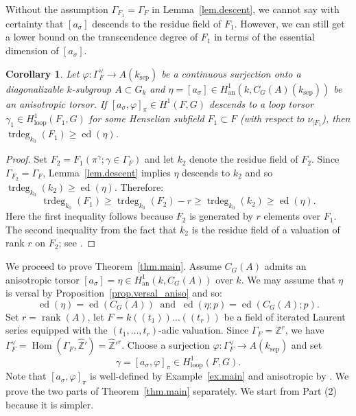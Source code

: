 \documentclass[12pt]{amsart}
\numberwithin{equation}{section}
\newtheorem{corollary}[theorem]{Corollary}
\theoremstyle{definition}
\newcommand{\bZ}{\mathbb{Z}}
\newcommand{\an}{\operatorname{an}}
\newcommand{\Hom}{\operatorname{Hom}}
\newcommand{\trdeg}{\operatorname{trdeg}}
\newcommand{\ed}{\operatorname{ed}}
\newcommand{\rank}{\operatorname{rank}}
\newcommand{\sep}{\operatorname{sep}}
\newcommand{\ksep}{k_{\sep}}
\newcommand{\vphi}{\varphi}
\newcommand{\I}[1]{\Gamma_{#1}^{\vee}}
\newcommand{\lop}{\operatorname{loop}}
\begin{document}
Without the assumption $\Gamma_{F_1}= \Gamma_F$ in Lemma~\ref{lem.descent}, we cannot say with certainty that $[a_\sigma]$ descends to the residue field of $F_1$. However, we can still get a lower bound on the transcendence degree of $F_1$ in terms of the essential dimension of $[a_\sigma]$.

\begin{corollary}\label{cor.lower_bound_corollary}
    Let $\vphi: \I{F}\to A(\ksep)$ be a continuous surjection onto a diagonalizable $k$-subgroup $A\subset G_k$ and $\eta=[a_\sigma]\in H^1_{\an}(k,C_G(A)(\ksep))$ be an anisotropic torsor. If $[a_\sigma,\vphi]_\pi\in H^1(F,G)$ descends to a loop torsor $\gamma_1 \in H^1_{\lop}(F_1,G)$ for some Henselian subfield $F_1 \subset F$ (with respect to $\nu_{|F_1}$), then $\trdeg_{k_0}(F_1) \geq \ed(\eta)$.
\end{corollary}
\begin{proof}
    Set $F_2 = F_1(\pi^{\gamma};\gamma\in \Gamma_{F})$ and let $k_2$ denote the residue field of $F_2$. Since $\Gamma_{F_2}=\Gamma_F$, Lemma~\ref{lem.descent} implies $\eta$ descends to $k_2$ and so $\trdeg_{k_0}(k_2)\geq \ed(\eta)$. Therefore:
    $$\trdeg_{k_0}(F_1) \geq \trdeg_{k_0}(F_2) - r \geq \trdeg_{k_0}(k_2) \geq \ed(\eta).$$
    Here the first inequality follows because  $F_2$ is generated by $r$ elements over $F_1$. The second inequality from the fact that $k_2$ is the residue field of a valuation of rank  $r$ on $F_2$; see \cite[Chapter VI, Theorem 3, Corollary 1]{zariski1960commutative}.
\end{proof}

We proceed to prove Theorem~\ref{thm.main}. Assume $C_G(A)$ admits an anisotropic torsor $[a_\sigma]=\eta \in H^1_{\an}(k,C_G(A))$ over $k$. We may assume that $\eta$ is versal by Proposition~\ref{prop.versal_aniso} and so:
    \begin{equation}\label{e.23}
    \ed(\eta) = \ed(C_G(A)) \ \text{ and } \ \ed(\eta;p) = \ed(C_G(A); p).
    \end{equation}
Set $r=\rank (A)$, let $F= k(\!(t_1)\!)\dots(\!(t_r)\!)$ be a field of iterated Laurent series equipped with the $(t_1,\dots,t_r)$-adic valuation. Since $\Gamma_F = \bZ^r$, we have $\I{F} = \Hom(\Gamma_F,\hat{\bZ}')= \hat{\bZ}'^r$. Choose a surjection $\vphi: \I{F}\to A(\ksep)$ and set $$\gamma = [a_\sigma,\vphi]_\pi \in H^1_{\lop}(F,G).$$ 
Note that $[a_\sigma,\vphi]_\pi$ is well-defined by Example~\ref{ex.main} and anisotropic by \cite[Proposition 4]{gille2024newloop}. We prove the two parts of Theorem~\ref{thm.main} separately. We start from Part (2) because it is simpler.
\end{document}

